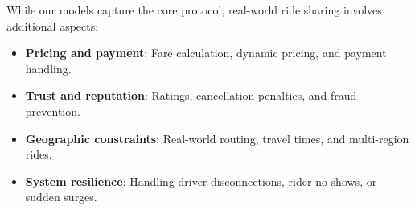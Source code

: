 \documentclass[11pt]{article}
\begin{document}
While our models capture the core protocol, real-world ride sharing involves additional aspects:
\begin{itemize}[leftmargin=1.5em]
  \item \textbf{Pricing and payment}: Fare calculation, dynamic pricing, and payment handling.
  \item \textbf{Trust and reputation}: Ratings, cancellation penalties, and fraud prevention.
  \item \textbf{Geographic constraints}: Real-world routing, travel times, and multi-region rides.
  \item \textbf{System resilience}: Handling driver disconnections, rider no-shows, or sudden surges.
\end{itemize}
\end{document}
